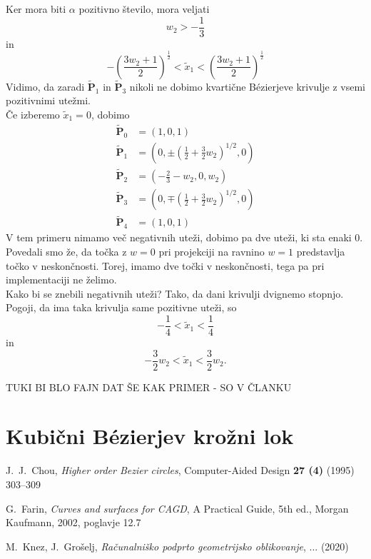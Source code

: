 \documentclass[a4paper,11pt]{article}
\theoremstyle{definition}
\theoremstyle{plain}
\begin{document}
Ker mora biti $\alpha$ pozitivno število, mora veljati
$$w_2>-\frac{1}{3}$$
in
$$-\left(\frac{3w_2+1}{2}\right)^{\frac{1}{2}}<\tilde{x}_1<\left(\frac{3w_2+1}{2}\right)^{\frac{1}{2}}$$
Vidimo, da zaradi $\boldsymbol{\tilde{P}}_1$ in $\boldsymbol{\tilde{P}}_3$ nikoli ne dobimo kvartične B\'ezierjeve krivulje z vsemi pozitivnimi utežmi. \\
Če izberemo $\tilde{x}_1=0$, dobimo  
\begin{align*}
\boldsymbol{\tilde{P}}_0 &= (1,0,1) \\
\boldsymbol{\tilde{P}}_1 &= (0,\pm (\frac{1}{2}+\frac{3}{2}w_2)^{1/2},0) \\
\boldsymbol{\tilde{P}}_2 &= (-\frac{2}{3}-w_2,0,w_2) \\
\boldsymbol{\tilde{P}}_3 &= (0,\mp(\frac{1}{2}+\frac{3}{2}w_2)^{1/2},0) \\
\boldsymbol{\tilde{P}}_4 &= (1,0,1)
\end{align*}
V tem primeru nimamo več negativnih uteži, dobimo pa dve uteži, ki sta enaki $0$. Povedali smo že, da točka z $w=0$ pri projekciji na ravnino $w=1$ predstavlja točko v neskončnosti. Torej, imamo dve točki v neskončnosti, tega pa pri implementaciji ne želimo. \\
Kako bi se znebili negativnih uteži? Tako, da dani krivulji dvignemo stopnjo. \\%
Pogoji, da ima taka krivulja same pozitivne uteži, so
$$-\frac{1}{4}<\tilde{x}_1<\frac{1}{4}$$
in
$$-\frac{3}{2}w_2<\tilde{x}_1<\frac{3}{2}w_2.$$

TUKI BI BLO FAJN DAT ŠE KAK PRIMER - SO V ČLANKU


\section{Kubični B\'ezierjev krožni lok}



\begin{thebibliography}{99}
J.~J.~Chou, \emph{Higher order Bezier circles}, Computer-Aided Design \textbf{27 (4)} (1995) 303--309

G.~Farin, \emph{Curves and surfaces for CAGD}, A Practical Guide, 5th ed., Morgan Kaufmann, 2002, poglavje 12.7

M.~Knez, J.~Grošelj, \emph{Računalniško podprto geometrijsko oblikovanje}, ... (2020)
\end{thebibliography}
\end{document}
